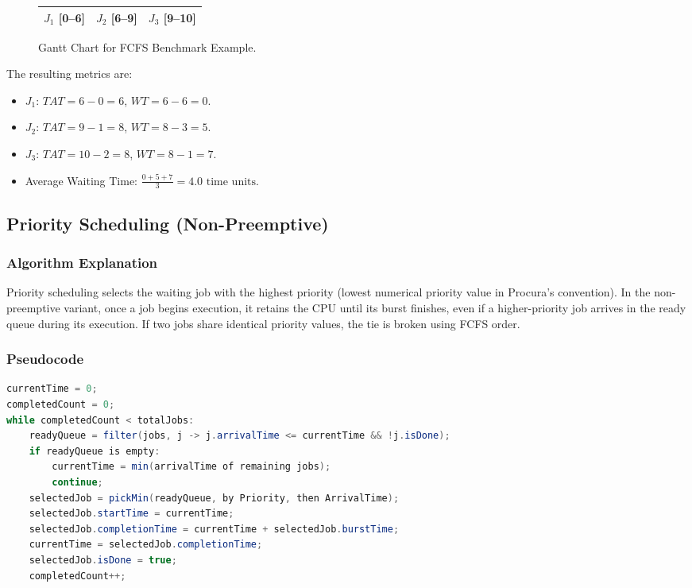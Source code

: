 \documentclass[12pt,a4paper]{article}
\begin{document}
\begin{figure}[H]
\centering
\begin{tabular}{|c|c|c|}
\hline
\textbf{$J_1$ [0--6]} & \textbf{$J_2$ [6--9]} & \textbf{$J_3$ [9--10]} \\
\hline
\end{tabular}
\caption{Gantt Chart for FCFS Benchmark Example.}
\end{figure}

The resulting metrics are:
\begin{itemize}
    \item $J_1$: $TAT = 6 - 0 = 6$, $WT = 6 - 6 = 0$.
    \item $J_2$: $TAT = 9 - 1 = 8$, $WT = 8 - 3 = 5$.
    \item $J_3$: $TAT = 10 - 2 = 8$, $WT = 8 - 1 = 7$.
    \item Average Waiting Time: $\frac{0 + 5 + 7}{3} = 4.0\text{ time units}$.
\end{itemize}

\subsection{Priority Scheduling (Non-Preemptive)}
\subsubsection{Algorithm Explanation}
Priority scheduling selects the waiting job with the highest priority (lowest numerical priority value in Procura's convention). In the non-preemptive variant, once a job begins execution, it retains the CPU until its burst finishes, even if a higher-priority job arrives in the ready queue during its execution. If two jobs share identical priority values, the tie is broken using FCFS order.

\subsubsection{Pseudocode}
\begin{lstlisting}[language=Java, caption={Non-Preemptive Priority Scheduling Logic}]
currentTime = 0;
completedCount = 0;
while completedCount < totalJobs:
    readyQueue = filter(jobs, j -> j.arrivalTime <= currentTime && !j.isDone);
    if readyQueue is empty:
        currentTime = min(arrivalTime of remaining jobs);
        continue;
    selectedJob = pickMin(readyQueue, by Priority, then ArrivalTime);
    selectedJob.startTime = currentTime;
    selectedJob.completionTime = currentTime + selectedJob.burstTime;
    currentTime = selectedJob.completionTime;
    selectedJob.isDone = true;
    completedCount++;
\end{lstlisting}
\end{document}
